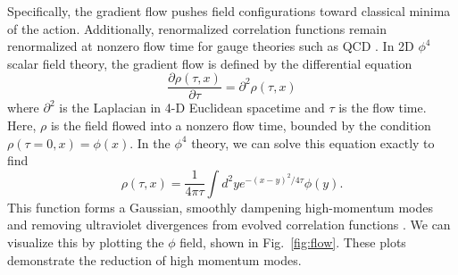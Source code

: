 Specifically, the gradient flow pushes field configurations toward classical minima of the action. Additionally, renormalized correlation functions remain renormalized at nonzero flow time for gauge theories such as QCD \cite{luscher2013}. In 2D $\phi^4$ scalar field theory, the gradient flow is defined by the differential equation 
\begin{equation}
    \frac{\partial \rho(\tau, x)}{\partial \tau} = \partial^2 \rho(\tau,x)
\end{equation}
where $\partial^2$ is the Laplacian in 4-D Euclidean spacetime and $\tau$ is the flow time. Here, $\rho$ is the field flowed into a nonzero flow time, bounded by the condition $\rho(\tau=0,x) = \phi(x)$. In the $\phi^4$ theory, we can solve this equation exactly to find \cite{monahan2016}
\begin{equation}
    \rho(\tau, x) = \frac{1}{4 \pi \tau} \int d^2 y e^{-(x-y)^2/4\tau} \phi(y).
\end{equation}
This function forms a Gaussian, smoothly dampening high-momentum modes and removing ultraviolet divergences from evolved correlation functions \cite{makino2015a}. We can visualize this by plotting the $\phi$ field, shown in Fig.~\ref{fig:flow}. These plots demonstrate the reduction of high momentum modes.
